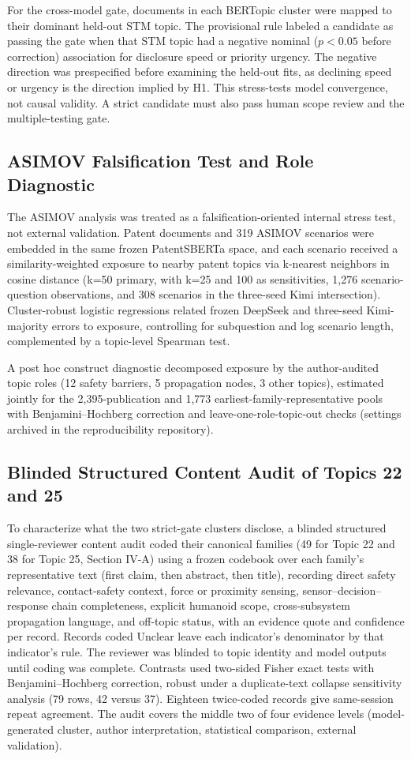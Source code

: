 \documentclass[letterpaper,9pt,conference]{ieeeconf}
\begin{document}
For the cross-model gate, documents in each BERTopic cluster were mapped to their dominant held-out STM topic. The provisional rule labeled a candidate as passing the gate when that STM topic had a negative nominal ($p < 0.05$ before correction) association for disclosure speed or priority urgency. The negative direction was prespecified before examining the held-out fits, as declining speed or urgency is the direction implied by H1. This stress-tests model convergence, not causal validity. A strict candidate must also pass human scope review and the multiple-testing gate.

\subsection{ASIMOV Falsification Test and Role Diagnostic}

The ASIMOV analysis was treated as a falsification-oriented internal stress test, not external validation. Patent documents and 319 ASIMOV scenarios were embedded in the same frozen PatentSBERTa space, and each scenario received a similarity-weighted exposure to nearby patent topics via k-nearest neighbors in cosine distance (k=50 primary, with k=25 and 100 as sensitivities, 1,276 scenario-question observations, and 308 scenarios in the three-seed Kimi intersection). Cluster-robust logistic regressions related frozen DeepSeek and three-seed Kimi-majority errors to exposure, controlling for subquestion and log scenario length, complemented by a topic-level Spearman test.

A post hoc construct diagnostic decomposed exposure by the author-audited topic roles (12 safety barriers, 5 propagation nodes, 3 other topics), estimated jointly for the 2,395-publication and 1,773 earliest-family-representative pools with Benjamini--Hochberg correction and leave-one-role-topic-out checks (settings archived in the reproducibility repository).

\subsection{Blinded Structured Content Audit of Topics 22 and 25}
To characterize what the two strict-gate clusters disclose, a blinded structured single-reviewer content audit coded their canonical families (49 for Topic 22 and 38 for Topic 25, Section IV-A) using a frozen codebook over each family's representative text (first claim, then abstract, then title), recording direct safety relevance, contact-safety context, force or proximity sensing, sensor--decision--response chain completeness, explicit humanoid scope, cross-subsystem propagation language, and off-topic status, with an evidence quote and confidence per record. Records coded Unclear leave each indicator's denominator by that indicator's rule. The reviewer was blinded to topic identity and model outputs until coding was complete. Contrasts used two-sided Fisher exact tests with Benjamini--Hochberg correction, robust under a duplicate-text collapse sensitivity analysis (79 rows, 42 versus 37). Eighteen twice-coded records give same-session repeat agreement. The audit covers the middle two of four evidence levels (model-generated cluster, author interpretation, statistical comparison, external validation).
\end{document}
